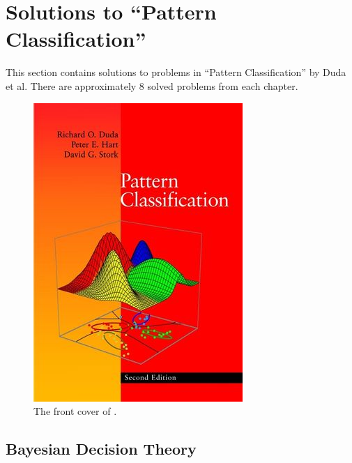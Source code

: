 \documentclass[12pt, a4paper]{article}
\begin{document}
\clearpage
\section{Solutions to ``Pattern Classification''}

This section contains solutions to problems in ``Pattern Classification'' by Duda et al.
There are approximately 8 solved problems from each chapter.

\begin{figure}[ht!]
\centering
\includegraphics[width=0.25\linewidth]{figs/duda}
\caption{The front cover of \cite{duda_pattern_2000}.}
\label{fig:duda}
\end{figure}



\setcounter{subsection}{1}
\subsection{Bayesian Decision Theory}
\end{document}
